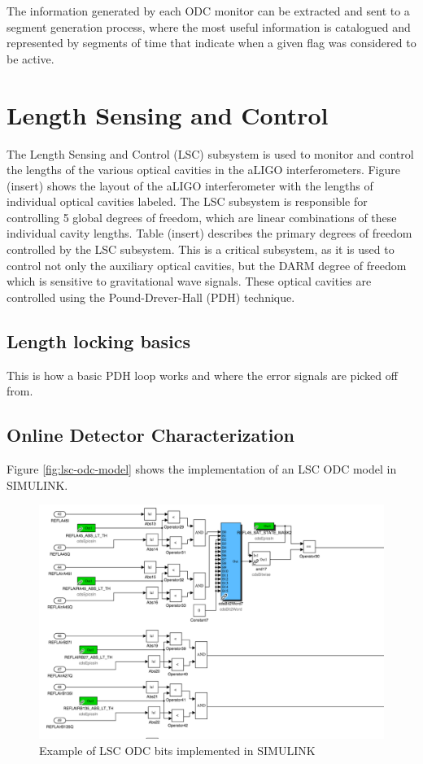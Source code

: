The information generated by each ODC monitor can be extracted and sent to a segment
generation process, where the most useful information is catalogued and represented by
segments of time that indicate when a given flag was considered to be active.

\section{Length Sensing and Control}

The Length Sensing and Control (LSC) subsystem is 
used to monitor and control the lengths of the various optical cavities in the 
aLIGO interferometers. Figure (insert) shows the layout 
of the aLIGO interferometer with the lengths of individual optical cavities 
labeled. The LSC subsystem is responsible for controlling 5 global degrees of freedom, 
which are linear combinations of these individual cavity lengths. Table (insert) 
describes the primary degrees of freedom controlled by the LSC subsystem. 
This is a critical subsystem, as it is used to control
not only the auxiliary optical cavities, but the DARM degree of freedom which
is sensitive to gravitational wave signals.
These optical cavities are controlled using the Pound-Drever-Hall (PDH) 
technique.

\subsection{Length locking basics}

This is how a basic PDH loop works and where the error signals are picked 
off from.

\subsection{Online Detector Characterization}


Figure \ref{fig:lsc-odc-model} shows the implementation of an LSC ODC 
model in SIMULINK. 

\begin{figure}[ht!]
\includegraphics[width=\textwidth]{figures/ODC/LSC-ODC-model}
\caption[LSC ODC SIMULINK Model Example]{Example of LSC ODC bits implemented in SIMULINK}
\end{figure}\label{fig:lsc-odc-model}

